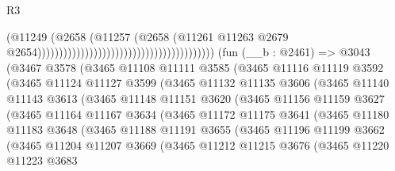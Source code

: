 \begin{lexlean}{R3}
\begin{coremodule}
                                                                            (@11249
                                                                              (@2658
                                                                                (@11257
                                                                                  (@2658
                                                                                    (@11261
                                                                                      @11263
                                                                                      @2679
                                                                                      @2654)))))))))))))))))))))))))))))))))))))))))
    (fun (__b : @2461) =>
    @3043
      (@3467
        @3578
        (@3465
          @11108
          @11111
          @3585
          (@3465
            @11116
            @11119
            @3592
            (@3465
              @11124
              @11127
              @3599
              (@3465
                @11132
                @11135
                @3606
                (@3465
                  @11140
                  @11143
                  @3613
                  (@3465
                    @11148
                    @11151
                    @3620
                    (@3465
                      @11156
                      @11159
                      @3627
                      (@3465
                        @11164
                        @11167
                        @3634
                        (@3465
                          @11172
                          @11175
                          @3641
                          (@3465
                            @11180
                            @11183
                            @3648
                            (@3465
                              @11188
                              @11191
                              @3655
                              (@3465
                                @11196
                                @11199
                                @3662
                                (@3465
                                  @11204
                                  @11207
                                  @3669
                                  (@3465
                                    @11212
                                    @11215
                                    @3676
                                    (@3465
                                      @11220
                                      @11223
                                      @3683

\end{coremodule}
\end{lexlean}

